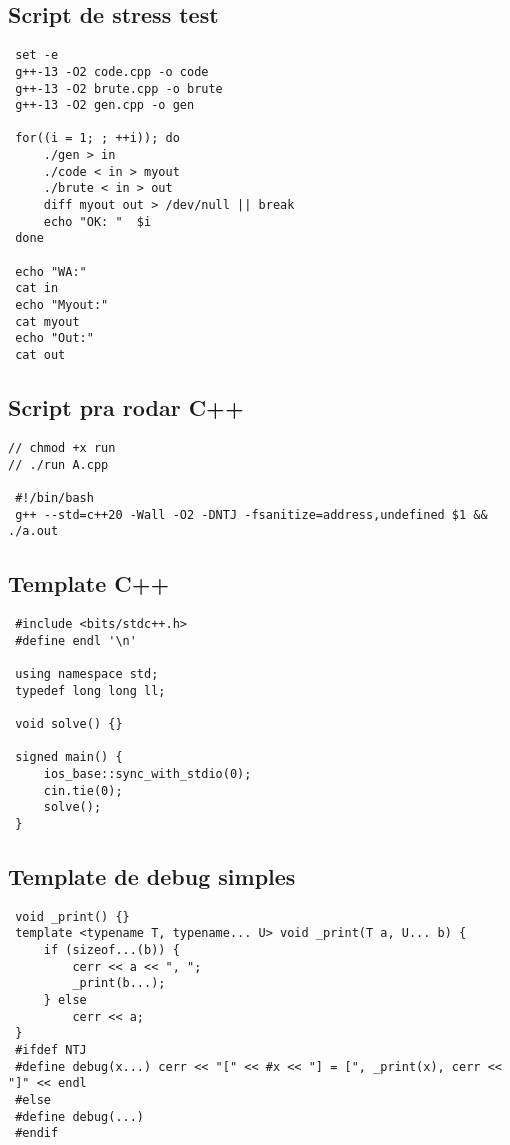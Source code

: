 \documentclass[11pt, a4paper, twoside]{article}
\begin{document}
\subsection{Script de stress test}
\begin{lstlisting}
 set -e
 g++-13 -O2 code.cpp -o code
 g++-13 -O2 brute.cpp -o brute
 g++-13 -O2 gen.cpp -o gen
 
 for((i = 1; ; ++i)); do
     ./gen > in
     ./code < in > myout
     ./brute < in > out
     diff myout out > /dev/null || break
     echo "OK: "  $i
 done
 
 echo "WA:"
 cat in
 echo "Myout:"
 cat myout
 echo "Out:"
 cat out
\end{lstlisting}

\subsection{Script pra rodar C++}
\begin{lstlisting}
// chmod +x run
// ./run A.cpp

 #!/bin/bash
 g++ --std=c++20 -Wall -O2 -DNTJ -fsanitize=address,undefined $1 && ./a.out
\end{lstlisting}

\subsection{Template C++}
\begin{lstlisting}
 #include <bits/stdc++.h>
 #define endl '\n'
 
 using namespace std;
 typedef long long ll;
 
 void solve() {}
 
 signed main() {
     ios_base::sync_with_stdio(0);
     cin.tie(0);
     solve();
 }
\end{lstlisting}

\subsection{Template de debug simples}
\begin{lstlisting}
 void _print() {}
 template <typename T, typename... U> void _print(T a, U... b) {
     if (sizeof...(b)) {
         cerr << a << ", ";
         _print(b...);
     } else
         cerr << a;
 }
 #ifdef NTJ
 #define debug(x...) cerr << "[" << #x << "] = [", _print(x), cerr << "]" << endl
 #else
 #define debug(...)
 #endif
\end{lstlisting}
\end{document}
